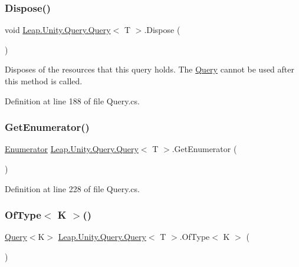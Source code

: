 \subsubsection{\texorpdfstring{Dispose()}{Dispose()}}
{\footnotesize\ttfamily void \mbox{\hyperlink{struct_leap_1_1_unity_1_1_query_1_1_query}{Leap.\+Unity.\+Query.\+Query}}$<$ T $>$.Dispose (\begin{DoxyParamCaption}{ }\end{DoxyParamCaption})}



Disposes of the resources that this query holds. The \mbox{\hyperlink{struct_leap_1_1_unity_1_1_query_1_1_query}{Query}} cannot be used after this method is called. 



Definition at line 188 of file Query.\+cs.

\mbox{\label{struct_leap_1_1_unity_1_1_query_1_1_query_a754dd1572406e8be39111c186daa1b74}} 
\subsubsection{\texorpdfstring{GetEnumerator()}{GetEnumerator()}}
{\footnotesize\ttfamily \mbox{\hyperlink{struct_leap_1_1_unity_1_1_query_1_1_query_1_1_enumerator}{Enumerator}} \mbox{\hyperlink{struct_leap_1_1_unity_1_1_query_1_1_query}{Leap.\+Unity.\+Query.\+Query}}$<$ T $>$.Get\+Enumerator (\begin{DoxyParamCaption}{ }\end{DoxyParamCaption})}



Definition at line 228 of file Query.\+cs.

\mbox{\label{struct_leap_1_1_unity_1_1_query_1_1_query_a88411752d9806dc0364de025ac9b53b9}} 
\subsubsection{\texorpdfstring{OfType$<$ K $>$()}{OfType< K >()}}
{\footnotesize\ttfamily \mbox{\hyperlink{struct_leap_1_1_unity_1_1_query_1_1_query}{Query}}$<$K$>$ \mbox{\hyperlink{struct_leap_1_1_unity_1_1_query_1_1_query}{Leap.\+Unity.\+Query.\+Query}}$<$ T $>$.Of\+Type$<$ K $>$ (\begin{DoxyParamCaption}{ }\end{DoxyParamCaption})}



